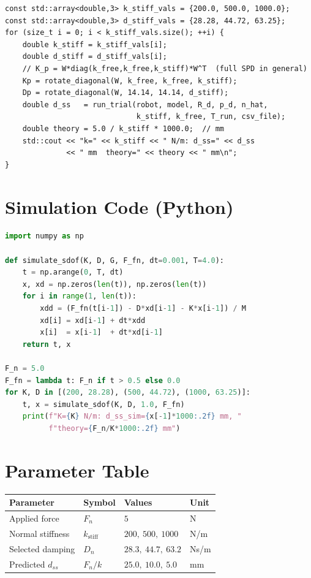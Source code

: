 \begin{lstlisting}[style=cppstyle,
  caption={Experiment~3: stiffness variation loop (C++)},
  label={lst:exp3_cpp}]
const std::array<double,3> k_stiff_vals = {200.0, 500.0, 1000.0};
const std::array<double,3> d_stiff_vals = {28.28, 44.72, 63.25};
for (size_t i = 0; i < k_stiff_vals.size(); ++i) {
    double k_stiff = k_stiff_vals[i];
    double d_stiff = d_stiff_vals[i];
    // K_p = W*diag(k_free,k_free,k_stiff)*W^T  (full SPD in general)
    Kp = rotate_diagonal(W, k_free, k_free, k_stiff);
    Dp = rotate_diagonal(W, 14.14, 14.14, d_stiff);
    double d_ss   = run_trial(robot, model, R_d, p_d, n_hat,
                              k_stiff, k_free, T_run, csv_file);
    double theory = 5.0 / k_stiff * 1000.0;  // mm
    std::cout << "k=" << k_stiff << " N/m: d_ss=" << d_ss
              << " mm  theory=" << theory << " mm\n";
}
\end{lstlisting}

\section{Simulation Code (Python)}

\begin{lstlisting}[style=cppstyle, language=Python,
  caption={Simulation for Experiment~3: stiffness variation},
  label={lst:exp3_sim}]
import numpy as np

def simulate_sdof(K, D, G, F_fn, dt=0.001, T=4.0):
    t = np.arange(0, T, dt)
    x, xd = np.zeros(len(t)), np.zeros(len(t))
    for i in range(1, len(t)):
        xdd = (F_fn(t[i-1]) - D*xd[i-1] - K*x[i-1]) / M
        xd[i] = xd[i-1] + dt*xdd
        x[i]  = x[i-1]  + dt*xd[i-1]
    return t, x

F_n = 5.0
F_fn = lambda t: F_n if t > 0.5 else 0.0
for K, D in [(200, 28.28), (500, 44.72), (1000, 63.25)]:
    t, x = simulate_sdof(K, D, 1.0, F_fn)
    print(f"K={K} N/m: d_ss_sim={x[-1]*1000:.2f} mm, "
          f"theory={F_n/K*1000:.2f} mm")
\end{lstlisting}

\section{Parameter Table}

\begin{center}
\renewcommand{\arraystretch}{1.3}
\begin{tabular}{@{}llll@{}}
\toprule
Parameter & Symbol & Values & Unit \\
\midrule
Applied force & $F_n$ & $5$ & N \\
Normal stiffness & $k_{\mathrm{stiff}}$ & $200,\ 500,\ 1000$ & N/m \\
Selected damping & $D_n$ & $28.3,\ 44.7,\ 63.2$ & Ns/m \\
Predicted $d_{ss}$ & $F_n/k$ & $25.0,\ 10.0,\ 5.0$ & mm \\
\bottomrule
\end{tabular}
\end{center}

